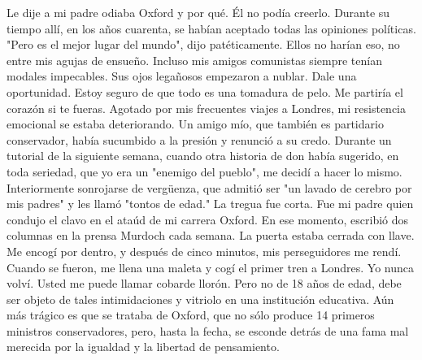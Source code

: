 Le dije a mi padre odiaba Oxford y por qué.
Él no podía creerlo.
Durante su tiempo allí, en los años cuarenta, se habían aceptado todas las opiniones políticas.
"Pero es el mejor lugar del mundo", dijo patéticamente.
Ellos no harían eso, no entre mis agujas de ensueño.
Incluso mis amigos comunistas siempre tenían modales impecables.
Sus ojos legañosos empezaron a nublar.
Dale una oportunidad.
Estoy seguro de que todo es una tomadura de pelo.
Me partiría el corazón si te fueras.
Agotado por mis frecuentes viajes a Londres, mi resistencia emocional se estaba deteriorando.
Un amigo mío, que también es partidario conservador, había sucumbido a la presión y renunció a su credo.
Durante un tutorial de la siguiente semana, cuando otra historia de don había sugerido, en toda seriedad, que yo era un "enemigo del pueblo", me decidí a hacer lo mismo.
Interiormente sonrojarse de vergüenza, que admitió ser "un lavado de cerebro por mis padres" y les llamó "tontos de edad."
La tregua fue corta.
Fue mi padre quien condujo el clavo en el ataúd de mi carrera Oxford.
En ese momento, escribió dos columnas en la prensa Murdoch cada semana.
La puerta estaba cerrada con llave.
Me encogí por dentro, y después de cinco minutos, mis perseguidores me rendí.
Cuando se fueron, me llena una maleta y cogí el primer tren a Londres.
Yo nunca volví.
Usted me puede llamar cobarde llorón.
Pero no de 18 años de edad, debe ser objeto de tales intimidaciones y vitriolo en una institución educativa.
Aún más trágico es que se trataba de Oxford, que no sólo produce 14 primeros ministros conservadores, pero, hasta la fecha, se esconde detrás de una fama mal merecida por la igualdad y la libertad de pensamiento.
